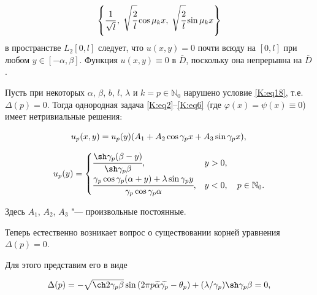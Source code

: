 $$\left\{ \cfrac{1}{\sqrt{l}}\,, \; \sqrt{\cfrac 2 l} \cos \mu_k x,\; \sqrt{\cfrac 2 l} \sin \mu_k x\right\}$$ в пространстве $L_2 [0,l]$ следует, что $u(x,y)=0$ почти всюду на $[0,l]$ при любом $y \in [-\alpha,\beta]$. Функция $u(x,y) \equiv 0$ в $\overline{D}$, поскольку она непрерывна на $\overline{D}$.



Пусть при некоторых $\alpha$, $\beta$, $b$, $l$, $\lambda$ и $k=p \in \mathbb{N}_{0}$ нарушено условие \eqref{K:eq18}, т.е. $\Delta(p)=0$. Тогда однородная задача  \eqref{K:eq2}--\eqref{K:eq6} (где $\varphi(x)=\psi(x)\equiv 0$) имеет нетривиальные решения:

\begin{equation}

\label{K:eq28}

u_p(x,y) =u_p(y) (A_1 +A_{2} \cos \gamma_p x+ A_3 \sin \gamma_p x),\\

\end{equation}

\begin{equation}

\label{K:eq29}

u_p(y)=\begin{cases}

\cfrac{\sh \gamma_p(\beta-y)}{\sh \gamma_p \beta},  & y>0,\\[2mm]

\cfrac{\gamma_p \cos \gamma_p(\alpha+y)+\lambda \sin \gamma_p y}{\gamma_p \cos \gamma_p \alpha}, & y<0,\quad p\in \mathbb  N_{0}.

\end{cases}

\end{equation}

Здесь $A_1$, $A_2$, $A_3$ "--- произвольные постоянные.



Теперь естественно возникает вопрос о существовании корней уравнения $\Delta (p) =0$. 

Для этого  представим его в виде 

\begin{equation}

\label{K:eq30}

\Delta(p) =-\sqrt{\ch 2 \gamma_p \beta} \sin \left(2\pi p \widetilde{\alpha}\widetilde{\gamma_{p}}-\theta_p \right) + ({\lambda}/{\gamma_p})\sh \gamma_p \beta=0,

\end{equation}

